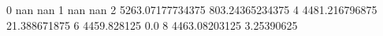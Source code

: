 0 nan nan
1 nan nan
2 5263.07177734375 803.24365234375
4 4481.216796875 21.388671875
6 4459.828125 0.0
8 4463.08203125 3.25390625
